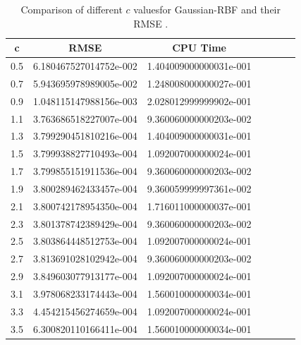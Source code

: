 \documentclass[12pt]{article}
\numberwithin{equation}{section} %
\begin{document}
\newpage
\begin{table}[h]
\centering
\begin{tabular}{|c|c|c|c|c|c|c|}
  \hline
  c &  RMSE & CPU Time \\
  \hline
  0.5 & 6.180467527014752e-002 &  1.404009000000031e-001  \\
  0.7 & 5.943695978989005e-002  &1.248008000000027e-001   \\
  0.9 &1.048115147988156e-003   & 2.028012999999902e-001   \\
  1.1 &3.763686518227007e-004   &9.360060000000203e-002 \\
  1.3 &3.799290451810216e-004  &1.404009000000031e-001 \\
  1.5 &3.799938827710493e-004   &1.092007000000024e-001  \\
  1.7 &3.799855151911536e-004   & 9.360060000000203e-002  \\
  1.9 &3.800289462433457e-004   &9.360059999997361e-002    \\
  2.1 & 3.800742178954350e-004  & 1.716011000000037e-001 \\
  2.3& 3.801378742389429e-004&9.360060000000203e-002\\
  2.5&3.803864448512753e-004&1.092007000000024e-001\\
  2.7&3.813691028102942e-004  &9.360060000000203e-002\\
  2.9&3.849603077913177e-004&1.092007000000024e-001\\
  3.1&3.978068233174443e-004 &1.560010000000034e-001\\
  3.3& 4.454215456274659e-004    &1.092007000000024e-001\\
  3.5&6.300820110166411e-004   &1.560010000000034e-001\\
  \hline

\end{tabular}
  \caption{Comparison of different $c$ valuesfor Gaussian-RBF and their RMSE .}\label{Tab_1DFinal}
\end{table}
\end{document}
